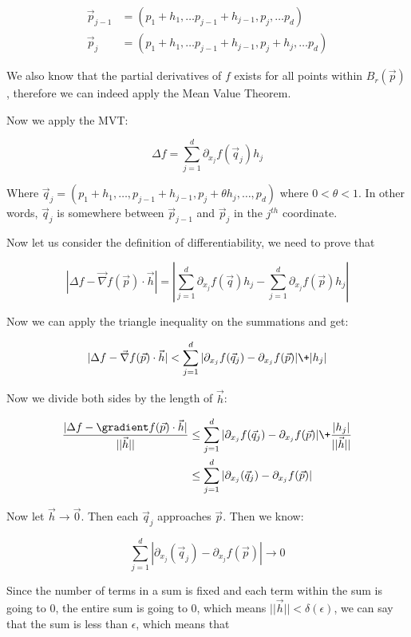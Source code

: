 \documentclass[11 pt, twoside]{article}
\begin{document}
\begin{align*}
    \vec{p}_{j - 1} &= (p_1 + h_1, \dots p_{j-1} + h_{j-1}, \boxed{p_j}, \dots p_d)\\
    \vec{p}_{j} &= (p_1 + h_1, \dots p_{j-1} + h_{j-1}, \boxed{p_j + h_j}, \dots p_d)
\end{align*}

We also know that the partial derivatives of $f$ exists for all points within
$B_r(\vec{p})$, therefore we can indeed apply the Mean Value Theorem.

Now we apply the MVT:

$$\Delta f = \sum_{j=1}^d \partial_{x_j} f(\vec{q}_j) h_j$$

Where $\vec{q}_j = (p_1 + h_1, \dots, p_{j-1} + h_{j-1}, p_j + \theta h_j,
\dots, p_d)$ where $0 < \theta < 1$. In other words, $\vec{q}_j$ is somewhere
between $\vec{p}_{j-1}$ and $\vec{p}_{j}$ in the $j^{th}$ coordinate.

Now let us consider the definition of differentiability, we need to prove that 


$$|\Delta f - \vec{\nabla}f(\vec{p}) \cdot \vec{h}| = |\sum_{j = 1}^d
\partial_{x_j} f(\vec{q}) h_j - \sum_{j = 1}^d \partial_{x_j} f(\vec{p}) h_j|$$

Now we can apply the triangle inequality on the summations and get:

$$|\Delta f - \vec{\nabla}f(\vec{p}) \cdot \vec{h}| < \sum_{j=1}^d |\partial_{x_j} f(\vec{q}_j) - \partial_{x_j} f(\vec{p})|
\+ |h_j|$$

Now we divide both sides by the length of $\vec{h}$:

\begin{align*}
    \frac{|\Delta f - \gradient f(\vec{p}) \cdot \vec{h}|}{||\vec{h}||} &\leq
    \sum_{j=1}^d |\partial_{x_j} f(\vec{q}_j) - \partial_{x_j} f(\vec{p})| \+
    \frac{|h_j|}{||\vec{h}||}\\
    &\leq \sum_{j=1}^d |\partial_{x_j} (\vec{q}_j) - \partial_{x_j} f(\vec{p})|
\end{align*}

Now let $\vec{h} \to \vec{0}$. Then each $\vec{q}_j$ approaches $\vec{p}$. Then
we know:

$$\sum_{j=1}^d |\partial_{x_j} (\vec{q}_j) - \partial_{x_j} f(\vec{p})| \to 0$$

Since the number of terms in a sum is fixed and each term within the sum is
going to 0, the entire sum is going to 0, which means $||\vec{h}|| <
\delta(\epsilon)$, we can say that the sum is less than $\epsilon$, which
means that
\end{document}

